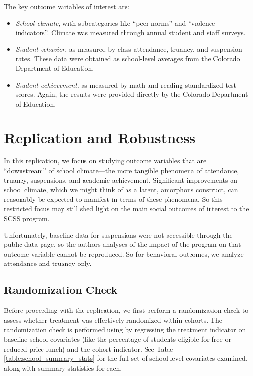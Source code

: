 \documentclass[11pt]{article}
\begin{document}
The key outcome variables of interest are:
\begin{itemize}
    \item \emph{School climate}, with subcategories like ``peer norms'' and ``violence
        indicators''. Climate was measured through annual student and staff
        surveys.
    \item \emph{Student behavior}, as measured by class attendance, truancy, and suspension rates.
        These data were obtained as school-level averages from the Colorado Department of Education.
    \item \emph{Student achievement}, as measured by math and reading standardized test scores. Again,
        the results were provided directly by the Colorado Department of Education.
\end{itemize}

\section{Replication and Robustness}

In this replication, we focus on studying outcome variables that are ``downstream''
of school climate—the more tangible phenomena of attendance,
truancy, suspensions, and academic achievement. Significant improvements on school climate,
which we might think of as a latent, amorphous construct, can reasonably be expected to manifest
in terms of these phenomena. So this restricted focus may still shed light on the main
social outcomes of interest to the SCSS program.

Unfortunately, baseline data for suspensions were not accessible through the public data
page, so the authors analyses of the impact of the program on that outcome variable
cannot be reproduced. So for behavioral outcomes, we analyze attendance and truancy only.

\subsection{Randomization Check}
Before proceeding with the replication, we first perform a randomization check
to assess whether treatment was effectively randomized within cohorts. The
randomization check is performed using by regressing the treatment indicator on
baseline school covariates (like the percentage of students eligible for free
or reduced price lunch) and the cohort indicator. See Table
\ref{table:school_summary_stats} for the full set of school-level covariates
examined, along with summary statistics for each.
\end{document}
